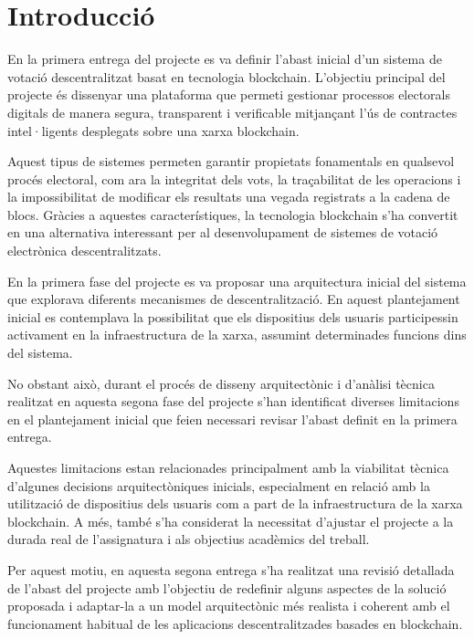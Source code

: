 \documentclass[12pt,a4paper]{article}
\begin{document}
\tableofcontents
\newpage

\section{Introducció}

En la primera entrega del projecte es va definir l'abast inicial d'un sistema de votació descentralitzat basat en tecnologia blockchain. L'objectiu principal del projecte és dissenyar una plataforma que permeti gestionar processos electorals digitals de manera segura, transparent i verificable mitjançant l'ús de contractes intel·ligents desplegats sobre una xarxa blockchain.

Aquest tipus de sistemes permeten garantir propietats fonamentals en qualsevol procés electoral, com ara la integritat dels vots, la traçabilitat de les operacions i la impossibilitat de modificar els resultats una vegada registrats a la cadena de blocs. Gràcies a aquestes característiques, la tecnologia blockchain s'ha convertit en una alternativa interessant per al desenvolupament de sistemes de votació electrònica descentralitzats.

En la primera fase del projecte es va proposar una arquitectura inicial del sistema que explorava diferents mecanismes de descentralització. En aquest plantejament inicial es contemplava la possibilitat que els dispositius dels usuaris participessin activament en la infraestructura de la xarxa, assumint determinades funcions dins del sistema.

No obstant això, durant el procés de disseny arquitectònic i d'anàlisi tècnica realitzat en aquesta segona fase del projecte s'han identificat diverses limitacions en el plantejament inicial que feien necessari revisar l'abast definit en la primera entrega.

Aquestes limitacions estan relacionades principalment amb la viabilitat tècnica d'algunes decisions arquitectòniques inicials, especialment en relació amb la utilització de dispositius dels usuaris com a part de la infraestructura de la xarxa blockchain. A més, també s'ha considerat la necessitat d'ajustar el projecte a la durada real de l'assignatura i als objectius acadèmics del treball.

Per aquest motiu, en aquesta segona entrega s'ha realitzat una revisió detallada de l'abast del projecte amb l'objectiu de redefinir alguns aspectes de la solució proposada i adaptar-la a un model arquitectònic més realista i coherent amb el funcionament habitual de les aplicacions descentralitzades basades en blockchain.
\end{document}
